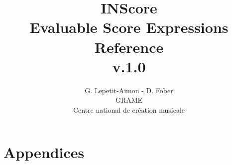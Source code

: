 \documentclass[a4paper,twoside]{article}
\newcommand{\toplevel}[1]	{\section{#1}}
\begin{document}
\title{\vspace*{7cm}INScore \\ Evaluable Score Expressions Reference \\v.1.0}
\author{G. Lepetit-Aimon - D. Fober\\ GRAME\\ Centre national de création musicale\\
}

\maketitle
\thispagestyle{empty}
 
\cleardoublepage
\tableofcontents
\newpage
\setcounter{page}{1}

\pagestyle{plain}



\newpage
\toplevel{Appendices}
\label{appendices}

\end{document}
